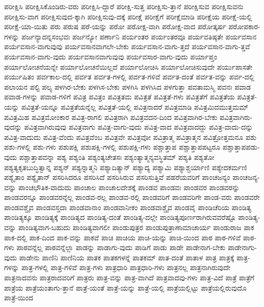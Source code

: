{ಪರೀಕ್ಷಿಸಿ
ಪರೀಕ್ಷಿಸಿಕೊಂಡಿರು-ವರು
ಪರೀಕ್ಷಿಸಿ-ದ್ದಾರೆ
ಪರೀಕ್ಷಿ-ಸುತ್ತ
ಪರೀಕ್ಷಿಸು-ತ್ತಾನೆ
ಪರೀಕ್ಷಿಸುವ
ಪರೀಕ್ಷಿಸುವನು
ಪರೀಕ್ಷಿಸು-ವಾಗ
ಪರೀಕ್ಷಿಸುವುದ-ಕ್ಕಾಗಿ
ಪರೀಕ್ಷಿಸುವು-ದಕ್ಕೆ
ಪರೀಕ್ಷೆ
ಪರೀಕ್ಷೆಗೆ
ಪರೀಕ್ಷೆಮಾಡಿ
ಪರೀಕ್ಷೆಯ
ಪರೀಕ್ಷೆ-ಯಲ್ಲಿ
ಪರೀಕ್ಷೆ-ಯಾ-ಯಿತು
ಪರು
ಪರುಷ
ಪರೆ-ಯನ್ನು
ಪರೋ
ಪರೋಕ್ಷ-ವಾಗಿ
ಪರೋಕ್ಷ-ವಾದ
ಪರೋತ್ಕರ್ಷ
ಪರೋಪಕಾರ-ಗಳನ್ನು
ಪರ್ಜನ್ಯಾದನ್ನಸಂಭವಃ
ಪರ್ಜನ್ಯೋ
ಪರ್ಣಾನಿ
ಪರ್ಯಂತರ
ಪರ್ಯಂತರವೂ
ಪರ್ಯವತಿಷ್ಠತೇ
ಪರ್ಯವಸಾನ
ಪರ್ಯವಸಾನ-ವಾಗುವುವು
ಪರ್ಯವಸಾನವಾಗಲೇ-ಬೇಕು
ಪರ್ಯವಸಾನ-ವಾಗು-ತ್ತದೆ
ಪರ್ಯವಸಾನ-ವಾಗು-ತ್ತವೆ
ಪರ್ಯವಸಾನ-ವಾಗು-ವುದು
ಪರ್ಯವಸಾನವಾಗುವುವು
ಪರ್ಯವಸಾರ-ವಾಗು-ವುದು
ಪರ್ಯಾಪ್ತಂ
ಪರ್ಯಾಲೋಚನೆಯನ್ನೇ
ಪರ್ಯಾಲೋಚನೆಯಿಲ್ಲದೆ
ಪರ್ಯಾಲೋಚಿಸಿ
ಪರ್ಯಾಲೋಚಿಸುವುದೇ
ಪರ್ಯುಪಾಸತೇ
ಪರ್ಯುಷಿತಂ
ಪರ್ವಕಾಲ-ದಲ್ಲಿ
ಪರ್ವತ
ಪರ್ವತ-ಗಳಲ್ಲಿ
ಪರ್ವತ-ಗಳಿವೆ
ಪರ್ವತ-ದಂತೆ
ಪರ್ವತ-ವನ್ನು
ಪರ್ವ-ದಲ್ಲಿ
ಪಲಾಯನ
ಪಲ್ಟಿ
ಪಲ್ಯ
ಪಳಗಿರ-ಬೇಕು
ಪಳಗಿಸ-ಬೇಕು
ಪಳಗಿಸಿ
ಪಳಗಿಸಿದ
ಪಳಗುತ್ತಾ
ಪವತಾಮಸ್ಮಿ
ಪವನಃ
ಪವಾಡ
ಪವಾಡ-ಗಳನ್ನು
ಪವಾಡ-ಗಳಿಗೆ
ಪವಿತ್ರ
ಪವಿತ್ರಂ
ಪವಿತ್ರತಮ
ಪವಿತ್ರತೆ
ಪವಿತ್ರತೆ-ಗಳು
ಪವಿತ್ರತೆಗೆ
ಪವಿತ್ರತೆಯ
ಪವಿತ್ರತೆ-ಯನ್ನು
ಪವಿತ್ರತೆ-ಯನ್ನೂ
ಪವಿತ್ರತೆಯನ್ನೆಲ್ಲ
ಪವಿತ್ರತೆ-ಯಲ್ಲಿ
ಪವಿತ್ರನಾದರೆ
ಪವಿತ್ರಮಾಡಿ
ಪವಿತ್ರಮಿದಮುತ್ತಮಮ್
ಪವಿತ್ರಮಿಹ
ಪವಿತ್ರಮೋಂಕಾರ
ಪವಿತ್ರ-ರಾಗಲಿ
ಪವಿತ್ರರಾಗಿ
ಪವಿತ್ರವದನ-ದಿಂದ
ಪವಿತ್ರವಾಗಿರ-ಬೇಕು
ಪವಿತ್ರವಾಗಿರು-ವುದನ್ನು
ಪವಿತ್ರವಾಗಿರುವುವು
ಪವಿತ್ರವಾಗು
ಪವಿತ್ರ-ವಾಗು-ವುದು
ಪವಿತ್ರ-ವಾದ
ಪವಿತ್ರವಾದದ್ದು
ಪವಿತ್ರ-ವಾದು-ದನ್ನು
ಪವಿತ್ರ-ವಾದುದು
ಪವಿತ್ರ-ವೆಂದು
ಪವಿತ್ರವೆಂಬ
ಪವಿತ್ರವೇ
ಪವಿತ್ರವೋ
ಪವಿತ್ರಾತ್ಮ
ಪವಿತ್ರಾತ್ಮನ
ಪವಿತ್ರೋತ್ತಮನೂ
ಪಶು
ಪಶು-ಗಳಲ್ಲಿ
ಪಶು-ಗಳು
ಪಶುಪಕ್ಷಿ
ಪಶುಪಕ್ಷಿ-ಗಳಲ್ಲಿ
ಪಶುಪಕ್ಷಿ-ಗಳು
ಪಶ್ಚಾತ್ತಾಪ
ಪಶ್ಚಾತ್ತಾಪಪಟ್ಟರೂ
ಪಶ್ಚಾತ್ತಾಪಪಡು-ವುದು
ಪಶ್ಚಾತ್ತಾಪವನ್ನಾ
ಪಶ್ಯ
ಪಶ್ಯಂತಿ
ಪಶ್ಯಂತ್ಯಚೇತಸಃ
ಪಶ್ಯಂತ್ಯಾತ್ಮನ್ಯವಸ್ಥಿತಮ್
ಪಶ್ಯತಿ
ಪಶ್ಯತೋ
ಪಶ್ಯತ್ಯಕೃತಬುದ್ಧಿತ್ವಾನ್ನ
ಪಶ್ಯನ್
ಪಶ್ಯನ್ನಾತ್ಮನಿ
ಪಶ್ಯಾದಿತ್ಯಾನ್
ಪಶ್ಯಾದ್ಯ
ಪಶ್ಯಾಮಿ
ಪಶ್ಯಾಶ್ಚರ್ಯಾಣಿ
ಪಶ್ಯೇದಕರ್ಮಣಿ
ಪಶ್ಯೈತಾಂ
ಪಶ್ಯೈತಾನ್
ಪಸರಿಸಿದರೂ
ಪಸರಿಸಿದೆ
ಪಸರಿಸಿರುವ
ಪಸರಿಸುತ್ತಿವೆ
ಪಹರೆಯವರಿಗೆ
ಪಾಂಚಜನ್ಯಂ
ಪಾಂಚಜನ್ಯ-ವನ್ನು
ಪಾಂಚಭೌತಿಕ-ವಾದುದು
ಪಾಂಚಾಲ
ಪಾಂಚಾಲದೇಶಕ್ಕೆ
ಪಾಂಡವ
ಪಾಂಡವಃ
ಪಾಂಡವರ
ಪಾಂಡವರನ್ನು
ಪಾಂಡವರನ್ನೂ
ಪಾಂಡವರನ್ನೆಲ್ಲ
ಪಾಂಡವ-ರಲ್ಲ
ಪಾಂಡವ-ರಲ್ಲಿ
ಪಾಂಡವರಿಗೆ
ಪಾಂಡವರಿಗೇ
ಪಾಂಡ-ವರು
ಪಾಂಡವರೇ
ಪಾಂಡವಶ್ಚೈವ
ಪಾಂಡವಸ್ತದಾ
ಪಾಂಡವಾನಾಂ
ಪಾಂಡವಾನೀಕಂ
ಪಾಂಡವಾಶ್ಚೈವ
ಪಾಂಡವೈ
ಪಾಂಡಿಚೆರಿಯ
ಪಾಂಡಿತ್ಯ
ಪಾಂಡಿತ್ಯಕ್ಕೂ
ಪಾಂಡಿತ್ಯಕ್ಕೆ
ಪಾಂಡಿತ್ಯದ
ಪಾಂಡಿತ್ಯ-ದಂತೆ
ಪಾಂಡಿತ್ಯ-ದಲ್ಲೇ
ಪಾಂಡಿತ್ಯಪೂರ್ಣರಾಗಿರುವವರೆಷ್ಟೊ
ಪಾಂಡಿತ್ಯ-ವನ್ನು
ಪಾಂಡಿತ್ಯವಾಗ-ಬಹುದು
ಪಾಂಡಿತ್ಯವಾಗಲೀ
ಪಾಂಡುಪುತ್ರರ
ಪಾಂಡುಪುತ್ರಾಣಾಮಾಚಾರ್ಯ
ಪಾಂಡುರಾಜ
ಪಾಕ
ಪಾಕ-ದಲ್ಲಿ
ಪಾಕ-ದಿಂದ
ಪಾಕ-ವನ್ನು
ಪಾಕವೆ
ಪಾಚಿ
ಪಾಚಿಯ
ಪಾಚಿ-ಯನ್ನು
ಪಾಚಿ-ಯಿಂದ
ಪಾಠ
ಪಾಠ-ಗಳಿವೆ
ಪಾಠ-ಗಳು
ಪಾಠವನ್ನೆಲ್ಲ
ಪಾಠವನ್ನೆಲ್ಲಾ
ಪಾಡನ್ನು
ಪಾಡಾಗು-ವುದು
ಪಾಡಿಗೆ
ಪಾಡು
ಪಾಡೇ
ಪಾಡೇನಾಗ-ಬೇಕು
ಪಾಡೇನಾಗು-ವುದು
ಪಾಡೇನು
ಪಾಣಿನಿ
ಪಾಣಿನಿಯ
ಪಾತಕ
ಪಾತಕಗಳನ್ನೆ
ಪಾತಕಮ್
ಪಾತ-ದಂತೆ
ಪಾತಾಳ
ಪಾತ್ರ
ಪಾತ್ರಕ್ಕೆ
ಪಾತ್ರ-ಗಳನ್ನು
ಪಾತ್ರ-ಗಳಲ್ಲಿ
ಪಾತ್ರ-ಗಳಿವೆ
ಪಾತ್ರ-ಗಳು
ಪಾತ್ರಧಾರಿ
ಪಾತ್ರಧಾರಿ-ಗಳು
ಪಾತ್ರನಲ್ಲ
ಪಾತ್ರನಾಗಿರುವುದೇ
ಪಾತ್ರನಾದವನು
ಪಾತ್ರರಾದವರಿಗೆ
ಪಾತ್ರರು
ಪಾತ್ರ-ವನ್ನು
ಪಾತ್ರ-ವಾಗಿದೆ
ಪಾತ್ರವಾದವು-ಗಳು
ಪಾತ್ರ-ವಿದೆ
ಪಾತ್ರೆ
ಪಾತ್ರೆಗೆ
ಪಾತ್ರೆಯ
ಪಾತ್ರೆಯಂತಾಗು-ತ್ತಾನೆ
ಪಾತ್ರೆ-ಯಂತೆ
ಪಾತ್ರೆ-ಯನ್ನು
ಪಾತ್ರೆ-ಯಲ್ಲಿ
ಪಾತ್ರೆಯಲ್ಲಿಟ್ಟು
ಪಾತ್ರೆಯಲ್ಲಿರುವುದೊ
ಪಾತ್ರೆ-ಯಿಂದ
}
